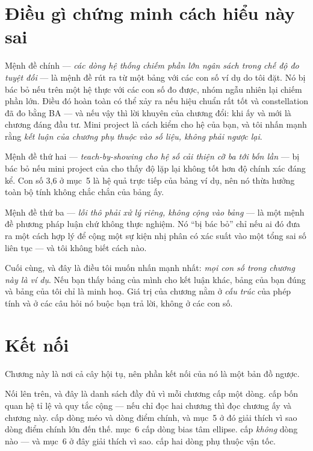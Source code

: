 \documentclass[../../marker.tex]{subfiles}
\begin{document}
\section{Điều gì chứng minh cách hiểu này sai}

Mệnh đề chính --- \emph{các dòng hệ thống chiếm phần lớn ngân sách trong chế độ đo tuyệt đối} --- là mệnh đề rút ra từ một bảng với các con số ví dụ do tôi đặt. Nó bị bác bỏ nếu trên một hệ thực với các con số đo được, nhóm ngẫu nhiên lại chiếm phần lớn. Điều đó hoàn toàn có thể xảy ra nếu hiệu chuẩn rất tốt và constellation đã đo bằng BA --- và nếu vậy thì lời khuyên của chương đổi: khi ấy  và  mới là chương đáng đầu tư. Mini project là cách kiểm cho hệ của bạn, và tôi nhấn mạnh rằng \emph{kết luận của chương phụ thuộc vào số liệu, không phải ngược lại}.

Mệnh đề thứ hai --- \emph{teach-by-showing cho hệ số cải thiện cỡ ba tới bốn lần} --- bị bác bỏ nếu mini project của  cho thấy độ lặp lại không tốt hơn độ chính xác đáng kể. Con số 3,6 ở mục~5 là hệ quả trực tiếp của bảng ví dụ, nên nó thừa hưởng toàn bộ tính không chắc chắn của bảng ấy.

Mệnh đề thứ ba --- \emph{lỗi thô phải xử lý riêng, không cộng vào bảng} --- là một mệnh đề phương pháp luận chứ không thực nghiệm. Nó ``bị bác bỏ'' chỉ nếu ai đó đưa ra một cách hợp lý để cộng một sự kiện nhị phân có xác suất vào một tổng sai số liên tục --- và tôi không biết cách nào.

Cuối cùng, và đây là điều tôi muốn nhấn mạnh nhất: \emph{mọi con số trong chương này là ví dụ}. Nếu bạn thấy bảng của mình cho kết luận khác, bảng của bạn đúng và bảng của tôi chỉ là minh hoạ. Giá trị của chương nằm ở \emph{cấu trúc} của phép tính và ở các câu hỏi nó buộc bạn trả lời, không ở các con số.

\section{Kết nối}

Chương này là nơi cả cây hội tụ, nên phần kết nối của nó là một bản đồ ngược.

Nối lên trên, và đây là danh sách đầy đủ vì mỗi chương cấp một dòng.  cấp bốn quan hệ tỉ lệ và quy tắc cộng --- nếu chỉ đọc hai chương thì đọc chương ấy và chương này.  cấp dòng méo và dòng điểm chính, và mục~5 ở đó giải thích vì sao dòng điểm chính lớn đến thế.  mục~6 cấp dòng bias tâm ellipse.  cấp \emph{không} dòng nào --- và mục~6 ở đây giải thích vì sao.  cấp hai dòng phụ thuộc vận tốc.
\end{document}
